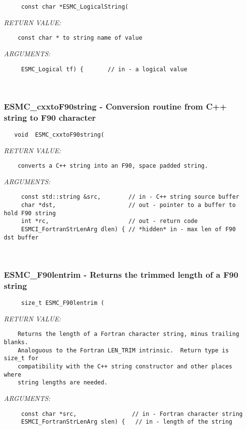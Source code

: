   
\begin{verbatim}     const char *ESMC_LogicalString(\end{verbatim}{\em RETURN VALUE:}
\begin{verbatim}    const char * to string name of value\end{verbatim}{\em ARGUMENTS:}
\begin{verbatim}     ESMC_Logical tf) {       // in - a logical value\end{verbatim}
 
 
\mbox{}\hrulefill\
 
\subsubsection [ESMC\_cxxtoF90string] {ESMC\_cxxtoF90string - Conversion routine from C++ string to F90 character}


  
\begin{verbatim}   void  ESMC_cxxtoF90string(\end{verbatim}{\em RETURN VALUE:}
\begin{verbatim}    converts a C++ string into an F90, space padded string.\end{verbatim}{\em ARGUMENTS:}
\begin{verbatim}     const std::string &src,        // in - C++ string source buffer
     char *dst,                     // out - pointer to a buffer to hold F90 string
     int *rc,                       // out - return code
     ESMCI_FortranStrLenArg dlen) { // *hidden* in - max len of F90 dst buffer\end{verbatim}
 
 
\mbox{}\hrulefill\
 
\subsubsection [ESMC\_F90lentrim] {ESMC\_F90lentrim - Returns the trimmed length of a F90 string}


  
\begin{verbatim}     size_t ESMC_F90lentrim (\end{verbatim}{\em RETURN VALUE:}
\begin{verbatim}    Returns the length of a Fortran character string, minus trailing blanks.
    Analoguous to the Fortran LEN_TRIM intrinsic.  Return type is size_t for
    compatibility with the C++ string constructor and other places where
    string lengths are needed.\end{verbatim}{\em ARGUMENTS:}
\begin{verbatim}     const char *src,                // in - Fortran character string
     ESMCI_FortranStrLenArg slen) {   // in - length of the string\end{verbatim}
 
